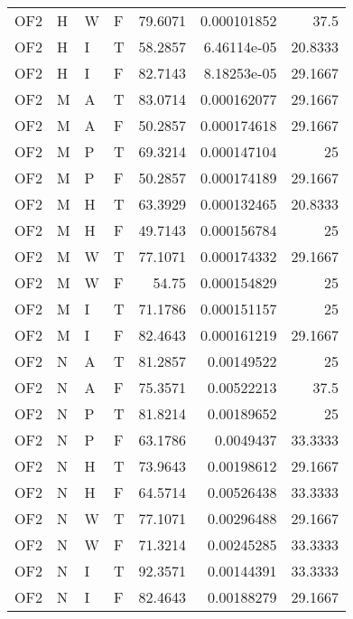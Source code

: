 \begin{table}[htb!]
{\begin{tabular}{llllrrr}
            OF2      & H     & W     & F          & 79.6071    & 0.000101852 & 37.5     \\
            OF2      & H     & I     & T          & 58.2857    & 6.46114e-05 & 20.8333  \\
            OF2      & H     & I     & F          & 82.7143    & 8.18253e-05 & 29.1667  \\
            OF2      & M     & A     & T          & 83.0714    & 0.000162077 & 29.1667  \\
            OF2      & M     & A     & F          & 50.2857    & 0.000174618 & 29.1667  \\
            OF2      & M     & P     & T          & 69.3214    & 0.000147104 & 25       \\
            OF2      & M     & P     & F          & 50.2857    & 0.000174189 & 29.1667  \\
            OF2      & M     & H     & T          & 63.3929    & 0.000132465 & 20.8333  \\
            OF2      & M     & H     & F          & 49.7143    & 0.000156784 & 25       \\
            OF2      & M     & W     & T          & 77.1071    & 0.000174332 & 29.1667  \\
            OF2      & M     & W     & F          & 54.75      & 0.000154829 & 25       \\
            OF2      & M     & I     & T          & 71.1786    & 0.000151157 & 25       \\
            OF2      & M     & I     & F          & 82.4643    & 0.000161219 & 29.1667  \\
            OF2      & N     & A     & T          & 81.2857    & 0.00149522  & 25       \\
            OF2      & N     & A     & F          & 75.3571    & 0.00522213  & 37.5     \\
            OF2      & N     & P     & T          & 81.8214    & 0.00189652  & 25       \\
            OF2      & N     & P     & F          & 63.1786    & 0.0049437   & 33.3333  \\
            OF2      & N     & H     & T          & 73.9643    & 0.00198612  & 29.1667  \\
            OF2      & N     & H     & F          & 64.5714    & 0.00526438  & 33.3333  \\
            OF2      & N     & W     & T          & 77.1071    & 0.00296488  & 29.1667  \\
            OF2      & N     & W     & F          & 71.3214    & 0.00245285  & 33.3333  \\
            OF2      & N     & I     & T          & 92.3571    & 0.00144391  & 33.3333  \\
            OF2      & N     & I     & F          & 82.4643    & 0.00188279  & 29.1667  \\
            \hline
        \end{tabular}
    }{
    }
\end{table} 
